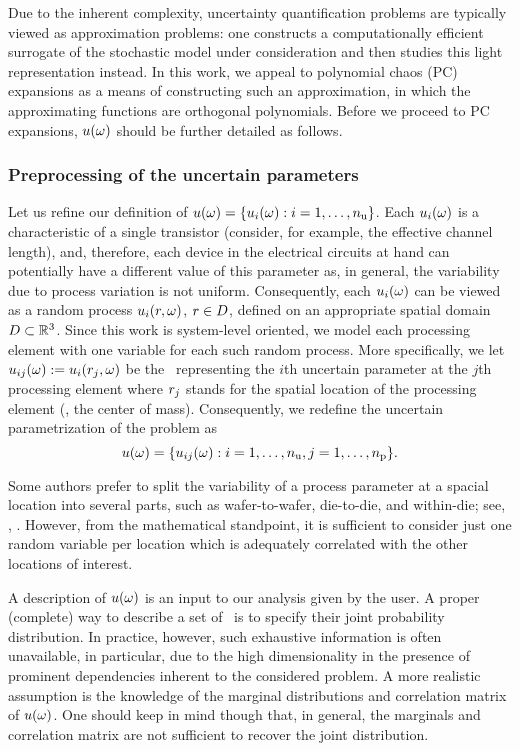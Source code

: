 Due to the inherent complexity, uncertainty quantification problems are typically viewed as approximation problems: one constructs a computationally efficient surrogate of the stochastic model under consideration and then studies this light representation instead.
In this work, we appeal to polynomial chaos (PC) expansions \cite{maitre2010, eldred2008} as a means of constructing such an approximation, in which the approximating functions are orthogonal polynomials.
Before we proceed to PC expansions, $u(\omega)$ should be further detailed as follows.

\subsubsection{Preprocessing of the uncertain parameters} 
Let us refine our definition of $u(\omega) = \{ u_i(\omega): i = 1, \dots, {n_\text{u}} \}$.
Each $u_i(\omega)$ is a characteristic of a single transistor (consider, for example, the effective channel length), and, therefore, each device in the electrical circuits at hand can potentially have a different value of this parameter as, in general, the variability due to process variation is not uniform.
Consequently, each $u_i(\omega)$ can be viewed as a random process $u_i(r, \omega)$, $r \in D$, defined on an appropriate spatial domain $D \subset \mathbb{R}^3$.
Since this work is system-level oriented, we model each processing element with one variable for each such random process.
More specifically, we let $u_{ij}(\omega) := u_i(r_j, \omega)$ be the \rv\ representing the $i$th uncertain parameter at the $j$th processing element where $r_j$ stands for the spatial location of the processing element (\eg, the center of mass).
Consequently, we redefine the uncertain parametrization of the problem as
\begin{equation} \elab{uncertain-parameters}
  \u(\o) = \{ \u_{ij}(\o): i = 1, \dots, \nparams, j = 1, \dots, \nprocs \}.
\end{equation}
\begin{remark}
Some authors prefer to split the variability of a process parameter at a spacial location into several parts, such as wafer-to-wafer, die-to-die, and within-die; see, \eg, \cite{juan2012}.
However, from the mathematical standpoint, it is sufficient to consider just one random variable per location which is adequately correlated with the other locations of interest.
\end{remark}

A description of $u(\omega)$ is an input to our analysis given by the user.
A proper (complete) way to describe a set of \rvs\ is to specify their joint probability distribution.
In practice, however, such exhaustive information is often unavailable, in particular, due to the high dimensionality in the presence of prominent dependencies inherent to the considered problem.
A more realistic assumption is the knowledge of the marginal distributions and correlation matrix of $u(\omega)$.
One should keep in mind though that, in general, the marginals and correlation matrix are not sufficient to recover the joint distribution.

